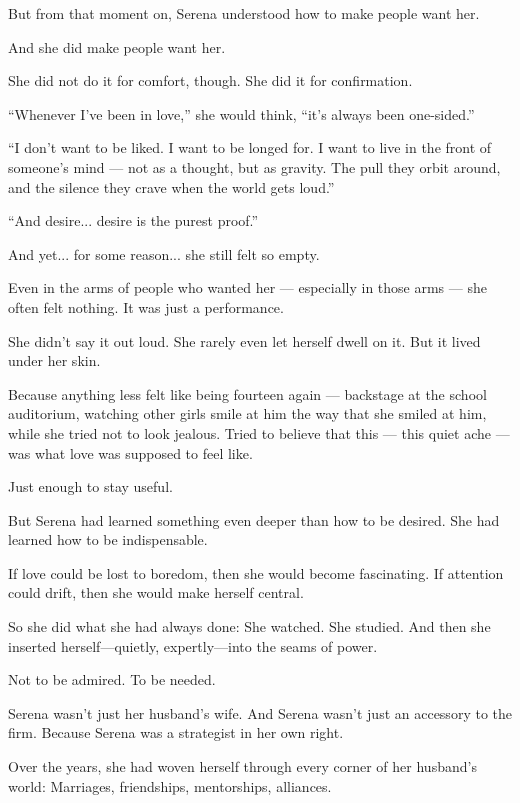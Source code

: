 But from that moment on, Serena understood how to 
make people want her.

And she did make people want her.

She did not do it for comfort, though.
She did it for confirmation.

``Whenever I’ve been in love,'' she would think, ``it’s always been one-sided.''

``I don’t want to be liked.
I want to be longed for.
I want to live in the front of someone’s mind —
not as a thought, but as gravity.
The pull they orbit around,
and the silence they crave when the world gets loud.''

``And desire...
desire is the purest proof.''

And yet... for some reason... she still felt so empty.

Even in the arms of people who wanted her 
--- 
especially in those arms 
--- 
she often felt nothing.
It was just a performance. 

She didn’t say it out loud. She rarely even let herself dwell on it.
But it lived under her skin.

Because anything less felt like being fourteen again —
backstage at the school auditorium,
watching other girls smile at him the way that she smiled at him,
while she tried not to look jealous.
Tried to believe that this — this quiet ache — was what love was supposed to feel like.

Just enough to stay useful.








But Serena had learned something even deeper than how to be desired.
She had learned how to be indispensable.

If love could be lost to boredom, then she would become fascinating.
If attention could drift, then she would make herself central.

So she did what she had always done:
She watched.
She studied.
And then she inserted herself—quietly, expertly—into the seams of power.

Not to be admired.
To be needed.

Serena wasn’t just her husband’s wife.
And Serena wasn’t just an accessory to the firm.
Because Serena was a strategist in her own right.

Over the years, she had woven herself through every corner of her husband’s world:
Marriages, friendships, mentorships, alliances.

